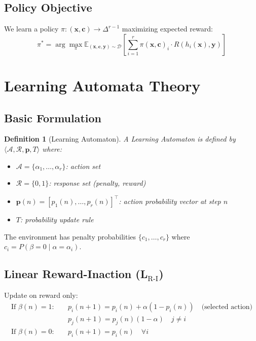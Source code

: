 \documentclass[11pt,a4paper]{article}
\newtheorem{definition}{Definition}
\begin{document}
\subsection{Policy Objective}

We learn a policy $\pi : (\mathbf{x}, \mathbf{c}) \rightarrow \Delta^{r-1}$ maximizing expected reward:
\begin{equation}
\pi^* = \arg\max_\pi \mathbb{E}_{(\mathbf{x}, \mathbf{c}, \mathbf{y}) \sim \mathcal{D}} \left[ \sum_{i=1}^{r} \pi(\mathbf{x}, \mathbf{c})_i \cdot R(h_i(\mathbf{x}), \mathbf{y}) \right]
\end{equation}


\section{Learning Automata Theory}
\label{app:la-theory}

\subsection{Basic Formulation}

\begin{definition}[Learning Automaton]
A Learning Automaton is defined by $\langle \mathcal{A}, \mathcal{R}, \mathbf{p}, T \rangle$ where:
\begin{itemize}[noitemsep]
    \item $\mathcal{A} = \{\alpha_1, \ldots, \alpha_r\}$: action set
    \item $\mathcal{R} = \{0, 1\}$: response set (penalty, reward)
    \item $\mathbf{p}(n) = [p_1(n), \ldots, p_r(n)]^\top$: action probability vector at step $n$
    \item $T$: probability update rule
\end{itemize}
\end{definition}

The environment has penalty probabilities $\{c_1, \ldots, c_r\}$ where $c_i = P(\beta = 0 \mid \alpha = \alpha_i)$.

\subsection{Linear Reward-Inaction (L$_{\text{R-I}}$)}

Update on reward only:
\begin{align}
\text{If } \beta(n) = 1: \quad & p_i(n+1) = p_i(n) + \alpha(1 - p_i(n)) \quad \text{(selected action)} \\
& p_j(n+1) = p_j(n)(1 - \alpha) \quad j \neq i \\
\text{If } \beta(n) = 0: \quad & p_i(n+1) = p_i(n) \quad \forall i
\end{align}
\end{document}
